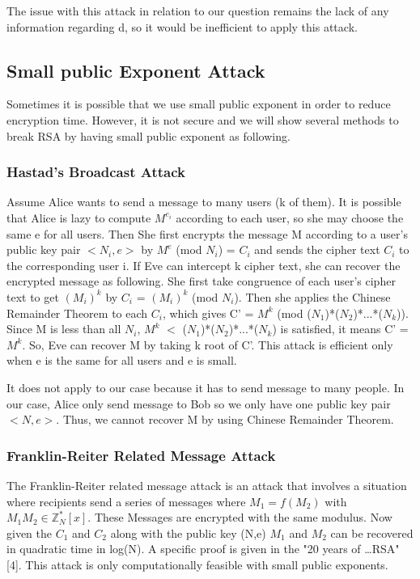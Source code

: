 \documentclass[12pt]{article} %
\begin{document}
	The issue with this attack in relation to our question remains the lack of any information regarding d, so it would be inefficient to apply this attack.
	
	
	\subsection{ Small public Exponent Attack}
	Sometimes it is possible that we use small public exponent in order to reduce encryption time. However, it is not secure and we will show several methods to break RSA by having small public exponent as following.
	
	\subsubsection{Hastad's Broadcast Attack}
	Assume Alice wants to send a message to many users (k of them). It is possible that Alice is lazy to compute $M^{e_i}$ according to each user, so she may choose the same e for all users.
	Then She first encrypts the message M according to a user's public key pair $<N_i, e>$ by $M^e$ (mod $N_i$) = $C_i$ and sends the cipher text $C_i$ to the corresponding user i. 
	If Eve can intercept k cipher text, she can recover the encrypted message as following.
	She first take congruence of each user's cipher text to get $(M_i)^k$ by $C_i$ = $(M_i)^k$ (mod $N_i$). Then she applies the Chinese Remainder Theorem to each $C_i$, which gives C' = $M^k$ (mod ($N_1$)*($N_2$)*...*($N_k$)).
	Since M is less than all $N_i$, $M^k$ $<$ ($N_1$)*($N_2$)*...*($N_k$) is satisfied, it means C' = $M^k$. So, Eve can recover M by taking k root of C'.
	This attack is efficient only when e is the same for all users and e is small.
	
	It does not apply to our case because it has to send message to many people. In our case, Alice only send message to Bob so we only have one public key pair $<N, e>$. Thus, we cannot recover M by using Chinese Remainder Theorem.
	
	\subsubsection{Franklin-Reiter Related Message Attack}
	The Franklin-Reiter related message attack is an attack that involves a situation where recipients send a series of messages where $M_1 = f(M_2)$ with $M_1M_2 \in \mathbb{Z}^{*}_N[x] $. These Messages are encrypted with the same modulus. Now given the $C_1$ and $C_2$ along with the public key (N,e) $M_1$ and $M_2$ can be recovered in quadratic time in log(N). A specific proof is given in the "20 years of \dots RSA" [4]. This attack is only computationally feasible with small public exponents.
	
\end{document}
